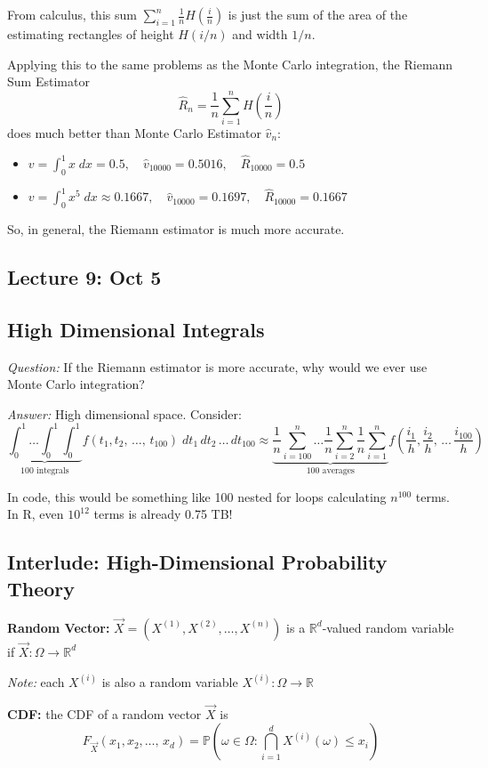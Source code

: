 \documentclass[12pt]{article}
\renewcommand{\hat}[1]{\widehat{#1}}
\renewcommand{\P}{\mathbb{P}}
\newcommand{\R}{\mathbb{R}}
\begin{document}
From calculus, this sum $\sum_{i=1}^n \frac{1}{n}H(\frac{i}{n})$ is just the sum of the area of the estimating rectangles of height $H(i/n)$ and width $1/n$.

Applying this to the same problems as the Monte Carlo integration, the Riemann Sum Estimator
\[\boxed{\hat R_n = \frac{1}{n}\sum_{i=1}^n H(\frac{i}{n})}\]
does much better than Monte Carlo Estimator $\hat v_n$:
\begin{itemize}
    \item $v = \int_0^1 x \; dx = 0.5, \quad \hat{v}_{10000} = 0.5016, \quad \hat{R}_{10000} = 0.5$
    \item $v = \int_0^1 x^5 \; dx \approx 0.1667, \quad \hat{v}_{10000} = 0.1697, \quad \hat{R}_{10000} = 0.1667$
\end{itemize}
So, in general, the Riemann estimator is much more accurate. 

\subsection*{Lecture 9: Oct 5}
\subsection*{High Dimensional Integrals}
\emph{Question:} If the Riemann estimator is more accurate, why would we ever use Monte Carlo integration? 

\emph{Answer:} High dimensional space. Consider:
\[\underbrace{\int_0^1 \dots \int_0^1 \int_0^1}_{\text{100 integrals}} f(t_1, t_2, \, \dots,\, t_{100}) \; dt_1\, dt_2\, \dots\, dt_{100} \approx \underbrace{\frac{1}{n}\sum_{i=100}^n \dots \frac{1}{n}\sum_{i=2}^n \frac{1}{n}\sum_{i=1}^n}_{\text{100 averages}} f(\frac{i_1}{h}, \frac{i_2}{h}, \, \dots\, \frac{i_{100}}{h})\]

In code, this would be something like 100 nested for loops calculating $n^{100}$ terms. In R, even $10^{12}$ terms is already 0.75 TB! 

\subsection*{Interlude: High-Dimensional Probability Theory}
\textbf{Random Vector:} $\vec{X} = (X^{(1)}, X^{(2)}, \dots, X^{(n)})$ is a $\R^d$-valued random variable if $\vec{X}: \Omega \to \R^d$

\emph{Note:} each $X^{(i)}$ is also a random variable $X^{(i)}: \Omega \to \R$

\textbf{CDF:} the CDF of a random vector $\vec X$ is 
\[F_{\vec X}(x_1, x_2, \dots,\, x_d) = \P(\omega \in \Omega: \bigcap_{i=1}^d X^{(i)}(\omega) \leq x_i)\] 
\end{document}
